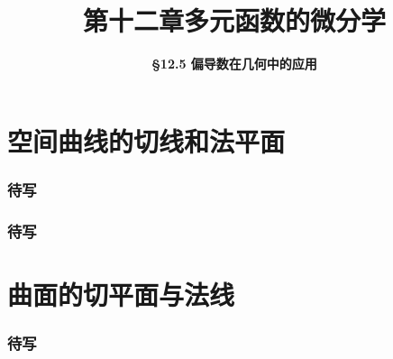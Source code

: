 \everymath{\displaystyle}



\title[第十二章\\
多元微分学]{\texorpdfstring{\LARGE \bfseries 第十二章\quad 多元函数的微分学}{第十二章 多元函数的微分学}} %
\author[\smaller \S 12.5\\
偏导数的几何应用] %
{\Large \bfseries \S 12.5 偏导数在几何中的应用}
\date{}





\begin{frame}

\titlepage %

\end{frame}



\section{空间曲线的切线和法平面}


\begin{frame}
\frametitle{待写}

\end{frame}


\begin{frame}
\frametitle{待写}

\end{frame}


\section{曲面的切平面与法线}


\begin{frame}
\frametitle{待写}

\end{frame}



